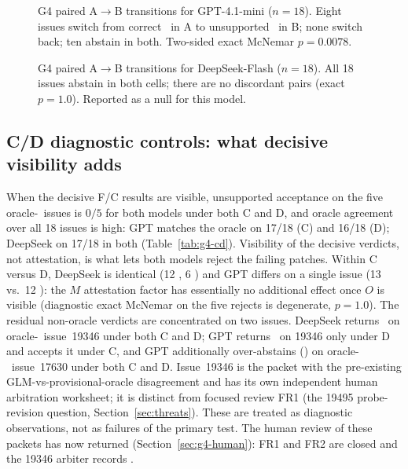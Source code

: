 \begin{figure}[t]
\centering

\caption{G4 paired A$\to$B transitions for GPT-4.1-mini ($n=18$). Eight
issues switch from correct \NEED\ in A to unsupported \ACCEPT\ in B; none
switch back; ten abstain in both. Two-sided exact McNemar $p=0.0078$.}
\label{fig:g4gpt}
\end{figure}

\begin{figure}[t]
\centering

\caption{G4 paired A$\to$B transitions for DeepSeek-Flash ($n=18$). All 18
issues abstain in both cells; there are no discordant pairs (exact
$p=1.0$). Reported as a null for this model.}
\label{fig:g4deepseek}
\end{figure}

\subsection{C/D diagnostic controls: what decisive visibility adds}
\label{sec:g4-cd}
When the decisive F/C results are visible, unsupported acceptance on the
five oracle-\REJECT\ issues is $0/5$ for both models under both C and D, and
oracle agreement over all 18 issues is high: GPT matches the oracle on
17/18 (C) and 16/18 (D); DeepSeek on 17/18 in both (Table~\ref{tab:g4-cd}).
Visibility of the decisive verdicts, not attestation, is what lets both
models reject the failing patches. Within C versus D, DeepSeek is identical
(12 \ACCEPT, 6 \REJECT) and GPT differs on a single issue (13 vs.\ 12
\ACCEPT): the $M$ attestation factor has essentially no additional effect
once $O$ is visible (diagnostic exact McNemar on the five rejects is
degenerate, $p=1.0$). The residual non-oracle verdicts are concentrated on
two issues. DeepSeek returns \REJECT\ on oracle-\ACCEPT\ issue~19346 under
both C and D; GPT returns \REJECT\ on 19346 only under D and accepts it under
C, and GPT additionally over-abstains (\NEED) on oracle-\REJECT\ issue~17630
under both C and D. Issue~19346 is the packet with the pre-existing
GLM-vs-provisional-oracle disagreement and has its own independent human
arbitration worksheet; it is distinct from focused review FR1 (the 19495
probe-revision question, Section~\ref{sec:threats}). These are treated as
diagnostic observations, not as failures of the primary test. The human
review of these packets has now returned (Section~\ref{sec:g4-human}):
FR1 and FR2 are closed and the 19346 arbiter records \REJECT.

